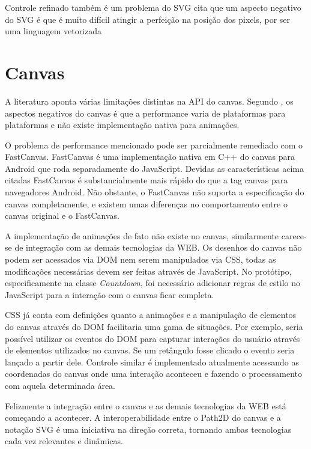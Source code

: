 Controle refinado também é um problema do SVG \cite{html5mostwanted}
cita que um aspecto negativo do SVG é que é muito difícil atingir a
perfeição na posição dos pixels, por ser uma linguagem vetorizada

\section{Canvas}

A literatura aponta várias limitações distintas na API do canvas.
Segundo \autocite{html5mostwanted}, os aspectos negativos do canvas é
que a performance varia de plataformas para plataformas e não existe
implementação nativa para animações.

O problema de performance mencionado pode ser parcialmente remediado
com o FastCanvas. FastCanvas é uma implementação nativa em C++ do
canvas para Android que roda separadamente do JavaScript. Devidas as
características acima citadas FastCanvas é substancialmente mais
rápido do que a tag canvas para navegadores Android. Não obstante, o
FastCanvas não suporta a especificação do canvas completamente, e
existem umas diferenças no comportamento entre o canvas original e o
FastCanvas.

A implementação de animações de fato não existe no canvas,
similarmente carece-se de integração com as demais tecnologias
da WEB. Os desenhos do canvas não podem ser acessados via DOM nem
serem manipulados via CSS, todas as modificações necessárias devem
ser feitas através de JavaScript.
No protótipo, especificamente na classe \textit{Countdown}, foi necessário
adicionar regras de estilo no JavaScript para a interação com o canvas
ficar completa.

CSS já conta com definições quanto a animações e a manipulação de
elementos do canvas através do DOM facilitaria uma gama de situações.
Por exemplo, seria possível utilizar os eventos do DOM para capturar
interações do usuário através de elementos utilizados no canvas.
Se um retângulo fosse clicado o evento seria lançado a partir dele.
Controle similar é implementado atualmente acessando as coordenadas
do canvas onde uma interação aconteceu e fazendo o processamento com
aquela determinada área.

Felizmente a integração entre o canvas e as demais tecnologias da
WEB está começando a acontecer. A interoperabilidade entre o Path2D
do canvas e a notação SVG é uma iniciativa na direção correta,
tornando ambas tecnologias cada vez relevantes e dinâmicas.

